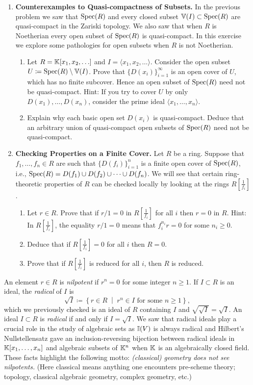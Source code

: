 \documentclass[12pt,reqno]{amsart}
\begin{document}
\begin{enumerate}[leftmargin=*, resume=problems]
\item \textbf{Counterexamples to Quasi-compactness of Subsets.} In the previous problem we saw that $\operatorname{Spec}(R)$ and every closed subset $\mathbb{V}(I) \subset \operatorname{Spec}(R)$ are quasi-compact in the Zariski topology. We also saw that when $R$ is Noetherian every open subset of $\operatorname{Spec}(R)$ is quasi-compact. In this exercise we explore some pathologies for open subsets when $R$ is not Noetherian.
\begin{enumerate}
	\item Let $R=\mathbb{K}[x_1,x_2,\ldots]$ and $I=\langle x_1,x_2,\ldots\rangle$. Consider the open subset $U\coloneqq \operatorname{Spec}(R) \setminus \mathbb{V}(I)$. Prove that $\{D(x_i)\}_{i=1}^{\infty}$ is an open cover of $U$, which has no finite subcover. Hence an open subset of $\operatorname{Spec}(R)$ need not be quasi-compact. Hint: If you try to cover $U$ by only $D(x_1),\ldots,D(x_n)$, consider the prime ideal $\langle x_1,\ldots,x_n\rangle$.
	\item Explain why each basic open set $D(x_i)$ is quasi-compact. Deduce that an arbitrary union of quasi-compact open subsets of $\operatorname{Spec}(R)$ need not be quasi-compact.
\end{enumerate}


\item \textbf{Checking Properties on a Finite Cover.} Let $R$ be a ring. Suppose that $f_1,\ldots,f_n \in R$ are such that $\{D(f_i)\}_{i=1}^{n}$ is a finite open cover of $\operatorname{Spec}(R)$, i.e., $\operatorname{Spec}(R)=D(f_1)\cup D(f_2)\cup \cdots \cup D(f_n)$. We will see that certain ring-theoretic properties of $R$ can be checked locally by looking at the rings $R[\frac{1}{f_i}]$.
\begin{enumerate}
	\item Let $r \in R$. Prove that if $r/1=0$ in $R[\frac{1}{f_i}]$ for all $i$ then $r=0$ in $R$. Hint: In $R[\frac{1}{f_i}]$, the equality $r/1=0$ means that $f_i^{n_i}r=0$ for some $n_i\ge 0$.
	\item Deduce that if  $R[\frac{1}{f_i}]=0$ for all $i$ then $R=0$. 
	\item Prove that if $R[\frac{1}{f_i}]$ is reduced for all $i$, then $R$ is reduced. 
\end{enumerate}
\end{enumerate}

\hrulefill

An element $r\in R$ is \emph{nilpotent} if $r^n=0$ for some integer $n\geq 1$. If $ I \subset R$ is an ideal, the \emph{radical} of $I$ is
\[
\sqrt{I}\coloneqq\left\{r\in R\;\middle|\; r^n\in I\text{ for some }n\geq 1\right\},
\]
which we previously checked is an ideal of $R$ containing $I$ and $\sqrt{\sqrt{I}}=\sqrt{I}$. An ideal $I \subset R$ is \emph{radical} if and only if $I=\sqrt{I}$. We saw that radical ideals play a crucial role in the study of algebraic sets as $\mathbb{I}(V)$ is always radical and Hilbert's Nullstellensatz gave an inclusion-reversing bijection between radical ideals in $\mathbb{K}[x_1,\ldots,x_n]$ and algebraic subsets of $\mathbb{K}^n$ when $\mathbb{K}$ is an algebraically closed field. These facts highlight the following motto: \emph{(classical) geometry does not see nilpotents.} (Here classical means anything one encounters pre-scheme theory; topology, classical algebraic geometry, complex geometry, etc.)
\end{document}
